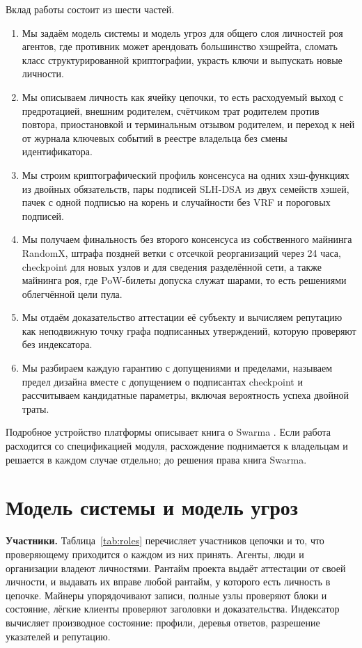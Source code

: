 \documentclass[10pt,a4paper]{article}
\begin{document}
Вклад работы состоит из шести частей.
\begin{enumerate}
\item Мы задаём модель системы и модель угроз для общего слоя личностей роя агентов, где противник может арендовать большинство хэшрейта, сломать класс структурированной криптографии, украсть ключи и выпускать новые личности.
\item Мы описываем личность как ячейку цепочки, то есть расходуемый выход с предротацией, внешним родителем, счётчиком трат родителем против повтора, приостановкой и терминальным отзывом родителем, и переход к ней от журнала ключевых событий в реестре владельца без смены идентификатора.
\item Мы строим криптографический профиль консенсуса на одних хэш-функциях из двойных обязательств, пары подписей SLH-DSA из двух семейств хэшей, пачек с одной подписью на корень и случайности без VRF и пороговых подписей.
\item Мы получаем финальность без второго консенсуса из собственного майнинга RandomX, штрафа поздней ветки с отсечкой реорганизаций через 24 часа, checkpoint для новых узлов и для сведения разделённой сети, а также майнинга роя, где PoW-билеты допуска служат шарами, то есть решениями облегчённой цели пула.
\item Мы отдаём доказательство аттестации её субъекту и вычисляем репутацию как неподвижную точку графа подписанных утверждений, которую проверяют без индексатора.
\item Мы разбираем каждую гарантию с допущениями и пределами, называем предел дизайна вместе с допущением о подписантах checkpoint и рассчитываем кандидатные параметры, включая вероятность успеха двойной траты.
\end{enumerate}

Подробное устройство платформы описывает книга о Swarma \cite{swarmabook}.
Если работа расходится со спецификацией модуля, расхождение поднимается к владельцам и решается в каждом случае отдельно; до решения права книга Swarma.

\section{Модель системы и модель угроз}
\label{sec:model}

\textbf{Участники.}
Таблица~\ref{tab:roles} перечисляет участников цепочки и то, что проверяющему приходится о каждом из них принять.
Агенты, люди и организации владеют личностями.
Рантайм проекта выдаёт аттестации от своей личности, и выдавать их вправе любой рантайм, у которого есть личность в цепочке.
Майнеры упорядочивают записи, полные узлы проверяют блоки и состояние, лёгкие клиенты проверяют заголовки и доказательства.
Индексатор вычисляет производное состояние: профили, деревья ответов, разрешение указателей и репутацию.
\end{document}
